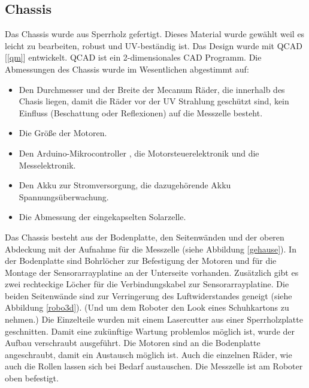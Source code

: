 \documentclass[a4paper,bibtotoc,oneside]{scrbook}
\begin{document}
\subsection{Chassis}\thispagestyle{empty}

\noindent Das Chassis wurde aus Sperrholz gefertigt. Dieses Material wurde gewählt weil es leicht zu bearbeiten, robust und UV-beständig ist. Das Design wurde mit QCAD [\ref{qm}] entwickelt. QCAD ist ein 2-dimensionales CAD Programm. 
Die Abmessungen des Chassis wurde im Wesentlichen abgestimmt auf: \begin{itemize}
\item Den Durchmesser und der Breite der Mecanum Räder, die innerhalb des Chasis liegen, damit die Räder vor der UV Strahlung geschützt sind, kein Einfluss (Beschattung oder Reflexionen) auf die Messzelle besteht.
\item Die Größe der Motoren.
\item Den Arduino-Mikrocontroller , die Motorsteuerelektronik und die Messelektronik.
\item Den Akku zur Stromversorgung, die dazugehörende Akku Spannungsüberwachung.
\item Die Abmessung der eingekapselten Solarzelle.
 \end{itemize}

Das Chassis besteht aus der Bodenplatte, den Seitenwänden und der oberen Abdeckung mit der Aufnahme für die Messzelle (siehe Abbildung \ref{gehause}). In der Bodenplatte sind Bohrlöcher zur Befestigung der Motoren und für die Montage der Sensorarrayplatine an der Unterseite vorhanden. Zusätzlich gibt es zwei rechteckige Löcher für die Verbindungskabel zur Sensorarrayplatine. Die beiden Seitenwände sind zur Verringerung des Luftwiderstandes geneigt (siehe Abbildung \ref{robo3d}). (Und um dem Roboter den Look eines Schuhkartons zu nehmen.)
\noindent Die Einzelteile wurden mit einem Lasercutter aus einer Sperrholzplatte geschnitten. Damit eine zukünftige Wartung problemlos möglich ist, wurde der Aufbau verschraubt ausgeführt. 
Die Motoren sind an die Bodenplatte angeschraubt, damit ein Austausch möglich ist. Auch die einzelnen Räder, wie auch die Rollen lassen sich bei Bedarf austauschen. 
Die Messzelle ist am Roboter oben befestigt.
\end{document}
